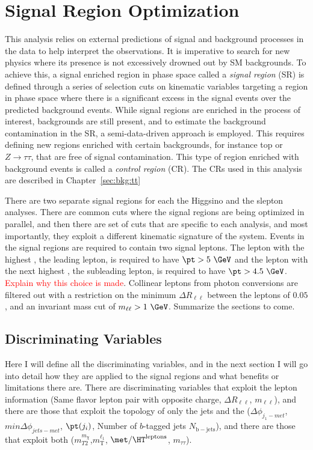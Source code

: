 \chapter{Signal Region Optimization}
 \label{sec:sr}
This analysis relies on external predictions of signal and background processes in the data to help interpret the observations.  It is imperative to search for new physics where its presence is not excessively drowned out by SM backgrounds.  To achieve this, a signal enriched region in phase space called a \textit{signal region} (SR) is defined through a series of selection cuts on kinematic variables targeting a region in phase space where there is a significant excess in the signal events over the predicted background events.    While signal regions are enriched in the process of interest, backgrounds are still present, and to estimate the background contamination in the SR, a semi-data-driven approach is employed.  This requires defining new regions enriched with certain backgrounds, for instance top or $Z\rightarrow\tau\tau$, that are free of signal contamination.  This type of region enriched with background events is called a \textit{control region} (CR).  The CRs used in this analysis are described in Chapter~\ref{sec:bkg:tt} 
 
There are two separate signal regions for each the Higgsino and the slepton analyses.  There are common cuts where the signal regions are being optimized in parallel, and then there are set of cuts that are specific to each analysis, and most importantly, they exploit a different kinematic signature of the system.  Events in the signal regions are required to contain two signal leptons.  The lepton with the highest \pt, the leading lepton, is required to have $\pt > 5~\GeV$ and the lepton with the next highest \pt, the subleading lepton, is required to have $\pt > 4.5~\GeV$.  \textcolor{red}{Explain why this choice is made}.  Collinear leptons from photon conversions are filtered out with a restriction on the minimum $\Delta R_{\ell\ell}$ between the leptons of $0.05$, and an invariant mass cut of $m_{\ell\ell} > 1 ~\GeV$.
Summarize the sections to come.
\section{Discriminating Variables}
\label{sec:discvar}
Here I will define all the discriminating variables, and in the next section I will go into detail how they are applied to the signal regions and what benefits or limitations there are.  There are discriminating variables that exploit the lepton information (Same flavor lepton pair with opposite charge, $\Delta R_{\ell\ell}$, $m_{\ell\ell}$), and there are those that exploit the topology of only the jets and the \met{} ($\Delta\phi_{ j_1-met}$, $min \Delta\phi_{jets-met}$, $\pt(j_i)$, Number of $b$-tagged jets $N_\mathrm{b-jets}$), and there are those that exploit both ($m_{T2}^{m_{\chi}}$,$m_\text{T}^{\ell_1}$, $\met/\HT^\text{leptons}$, $m_{\tau\tau}$).  

